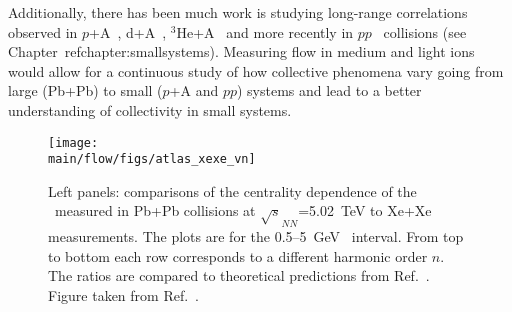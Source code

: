 Additionally, there has been much work is studying long-range correlations
  observed in $p$+A~\cite{HION-2016-01,CMS:2012qk,Abelev:2012ola,HION-2012-13,HION-2013-04},
  d+A~\cite{Aidala:2017pup}, $^{3}\mathrm{He}$+A~\cite{Adare:2015ctn} 
  and more recently in $pp$~\cite{HION-2015-09,HION-2016-01} collisions 
  (see Chapter~ref{chapter:smallsystems}).
Measuring flow in medium and light ions would allow for a continuous study 
  of how collective phenomena vary going from large (Pb+Pb) to small 
  ($p$+A and $pp$) systems and lead to a better understanding of collectivity
  in small systems.


\begin{figure}[!htb]
\begin{center}
\texttt{[image: \\main/flow/figs/atlas\_xexe\_vn]}
\caption{
Left panels: comparisons of the centrality dependence of the \vn\ measured 
  in Pb+Pb collisions at $\sqrt{s}_{NN}$=5.02~TeV to Xe+Xe measurements. 
The plots are for the 0.5--5~GeV \pT\ interval. 
From top to bottom each row corresponds to a different harmonic order $n$.
The ratios are compared to theoretical predictions from Ref.~\cite{Giacalone:2017dud}.
Figure taken from Ref.~\cite{ATLAS-CONF-2018-011}.
}
\label{fig:atlas_xexe_vn}
\end{center}
\end{figure}
